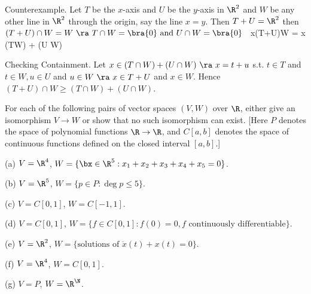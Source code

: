 \begin{solution}[\bf Solution.]
Counterexample. Let $T$ be the $x$-axis and $U$ be the $y$-axis in $\R^2$ and $W$ be any other line in $\R^2$ through the origin, say the line $x=y$. Then $T+U = \R^2$ then $(T+U)\cap W = W \ \ra \ T\cap W = \bra{0} \text{ and } U\cap W = \bra{0}$
\be
\ra\ \exists x\in (T+U)\cap W =  x \notin (T\cap W) + (U \cap W) 
\ee

Checking Containment. Let $x\in (T\cap W)+(U\cap W)\ \ra\ x= t+u$ s.t. $t\in T$ and $t\in W, u \in U$ and $u \in W \ \ra \ x\in T+U$ and $x\in W$. Hence $(T+U)\cap W \geq (T\cap W)+(U \cap W)$.
\een
\een
\end{solution}


\begin{problem}
For each of the following pairs of vector spaces $(V,W)$ over $\R$, either give an isomorphism $V \to W$ or show that no such isomorphism can exist. [Here $P$ denotes the space of polynomial functions $\R \to \R$, and $C[a, b]$ denotes the space of continuous functions defined on the closed interval $[a, b]$.]
\ben
\item [(a)] $V = \R^4$, $W = \{\bx \in \R^5: x_1 + x_2 + x_3 + x_4 + x_5 = 0\}$.
\item [(b)] $V = \R^5$, $W = \{p \in P: \deg p \leq 5\}$.
\item [(c)] $V = C[0, 1]$, $W = C[-1, 1]$.
\item [(d)] $V = C[0, 1]$, $W = \{f \in C[0, 1] : f(0) = 0, f \text{ continuously differentiable}\}$.
\item [(e)] $V = \R^2$, $W = \{\text{solutions of }\ddot{x}(t) + x(t) = 0\}$.
\item [(f)] $V = \R^4$, $W = C[0, 1]$.
\item [(g)] $V = P$, $W = \R^\N$.
\een
\end{problem}

